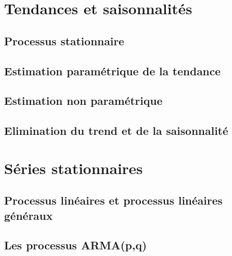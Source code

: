 \documentclass[
]{book}
\begin{document}
\hypertarget{tendances-et-saisonnalituxe9s}{%
\chapter{Tendances et saisonnalités}\label{tendances-et-saisonnalituxe9s}}

\hypertarget{processus-stationnaire}{%
\section{Processus stationnaire}\label{processus-stationnaire}}

\hypertarget{estimation-paramuxe9trique-de-la-tendance}{%
\section{Estimation paramétrique de la tendance}\label{estimation-paramuxe9trique-de-la-tendance}}

\hypertarget{estimation-non-paramuxe9trique}{%
\section{Estimation non paramétrique}\label{estimation-non-paramuxe9trique}}

\hypertarget{elimination-du-trend-et-de-la-saisonnalituxe9}{%
\section{Elimination du trend et de la saisonnalité}\label{elimination-du-trend-et-de-la-saisonnalituxe9}}

\hypertarget{series-stat}{%
\chapter{Séries stationnaires}\label{series-stat}}

\hypertarget{processus-linuxe9aires-et-processus-linuxe9aires-guxe9nuxe9raux}{%
\section{Processus linéaires et processus linéaires généraux}\label{processus-linuxe9aires-et-processus-linuxe9aires-guxe9nuxe9raux}}

\hypertarget{les-processus-armapq}{%
\section{Les processus ARMA(p,q)}\label{les-processus-armapq}}
\end{document}
